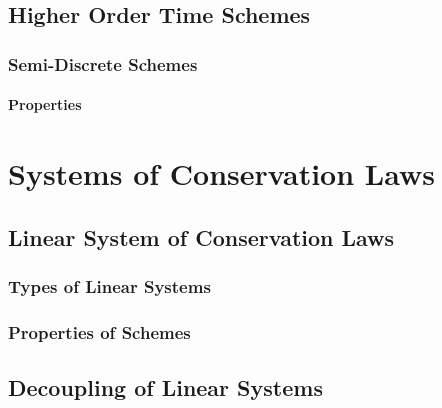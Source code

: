 \documentclass[
  fourColumns,
  landscape
]{formularyETH/formularyETH}
\begin{document}
    \subsection{Higher Order Time Schemes}\label{subsubsec:higher_order_time_schemes}
      \subsubsection{Semi-Discrete Schemes}\label{subsubsubsec:semi-discrete_schemes}
      
          
        \paragraph{Properties}
          

\newpage
\section{Systems of Conservation Laws}\label{subsec:systems_of_conservation_laws}
      
      \subsection{Linear System of Conservation Laws}\label{subsubsec:linear_system_of_conservation_laws}
      
      \subsubsection{Types of Linear Systems}\label{subsubsubsec:types_of_linear_systems}
        
      \subsubsection{Properties of Schemes}\label{subsec:properties_of_schemes}
        \label{subsec:total_variation_diminishing}
        
      \subsection{Decoupling of Linear Systems}\label{subsubsubsec:decoupeling}
        
        \label{para:riemann_problems}
        
\end{document}

